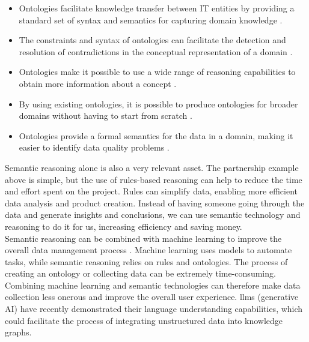             \begin{itemize}
                \item Ontologies facilitate knowledge transfer between IT entities by providing a standard set of syntax and semantics for capturing domain knowledge \cite{spelten2023simulation}. 
                \item The constraints and syntax of ontologies can facilitate the detection and resolution of contradictions in the conceptual representation of a domain \cite{chen2012recommendation}. 
                \item Ontologies make it possible to use a wide range of reasoning capabilities to obtain more information about a concept \cite{chen2012recommendation}. 
                \item By using existing ontologies, it is possible to produce ontologies for broader domains without having to start from scratch \cite{bizer2008linked}. 
                \item Ontologies provide a formal semantics for the data in a domain, making it easier to identify data quality problems \cite{spelten2023simulation, li2018ontology}.
            \end{itemize}
        
            Semantic reasoning alone is also a very relevant asset. The partnership example above is simple, but the use of rules-based reasoning can help to reduce the time and effort spent on the project. Rules can simplify data, enabling more efficient data analysis and product creation. Instead of having someone going through the data and generate insights and conclusions, we can use semantic technology and reasoning to do it for us, increasing efficiency and saving money.\\
        
            Semantic reasoning can be combined with machine learning to improve the overall data management process \cite{pan2024unifying}. Machine learning uses models to automate tasks, while semantic reasoning relies on rules and ontologies. The process of creating an ontology or collecting data can be extremely time-consuming. Combining machine learning and semantic technologies can therefore make data collection less onerous and improve the overall user experience. \acrfull{llms} (generative AI) have recently demonstrated their language understanding capabilities, which could facilitate the process of integrating unstructured data into knowledge graphs.\\
        
